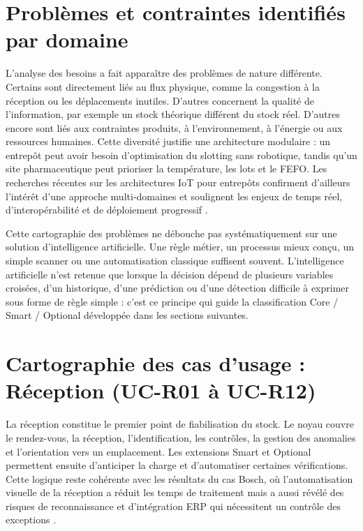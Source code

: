 

\section{Problèmes et contraintes identifiés par domaine}

\label{sec:3.2}

L’analyse des besoins a fait apparaître des problèmes de nature différente. Certains sont directement liés au flux physique, comme la congestion à la réception ou les déplacements inutiles. D’autres concernent la qualité de l’information, par exemple un stock théorique différent du stock réel. D’autres encore sont liés aux contraintes produits, à l’environnement, à l’énergie ou aux ressources humaines. Cette diversité justifie une architecture modulaire : un entrepôt peut avoir besoin d’optimisation du slotting sans robotique, tandis qu’un site pharmaceutique peut prioriser la température, les lots et le FEFO. Les recherches récentes sur les architectures IoT pour entrepôts confirment d’ailleurs l’intérêt d’une approche multi-domaines et soulignent les enjeux de temps réel, d’interopérabilité et de déploiement progressif \cite{ref3}\cite{ref12}.




Cette cartographie des problèmes ne débouche pas systématiquement sur une solution d’intelligence artificielle. Une règle métier, un processus mieux conçu, un simple scanner ou une automatisation classique suffisent souvent. L’intelligence artificielle n’est retenue que lorsque la décision dépend de plusieurs variables croisées, d’un historique, d’une prédiction ou d’une détection difficile à exprimer sous forme de règle simple  :  c’est ce principe qui guide la classification Core / Smart / Optional développée dans les sections suivantes.



\section{Cartographie des cas d’usage  :  Réception (UC-R01 à UC-R12)}

\label{sec:3.3}

La réception constitue le premier point de fiabilisation du stock. Le noyau couvre le rendez-vous, la réception, l’identification, les contrôles, la gestion des anomalies et l’orientation vers un emplacement. Les extensions Smart et Optional permettent ensuite d’anticiper la charge et d’automatiser certaines vérifications. Cette logique reste cohérente avec les résultats du cas Bosch, où l’automatisation visuelle de la réception a réduit les temps de traitement mais a aussi révélé des risques de reconnaissance et d’intégration ERP qui nécessitent un contrôle des exceptions \cite{ref11}.



